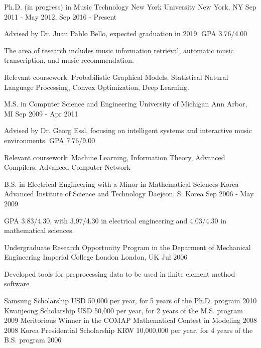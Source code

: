 \documentclass[12pt, a4paper]{awesome-cv}
\begin{document}
	
	\begin{cventries}
		\cventry
		{Ph.D. (in progress) in Music Technology}
		{New York University}
		{New York, NY}
		{Sep 2011 - May 2012, Sep 2016 - Present}
		{
			\begin{cvitemscondensed}
				\item Advised by Dr. Juan Pablo Bello, expected graduation in 2019. GPA 3.76/4.00
				\item The area of research includes music information retrieval, automatic music transcription, and music recommendation.
				\item Relevant coursework: Probabilistic Graphical Models, Statistical Natural Language Processing, Convex Optimization, Deep Learning.
			\end{cvitemscondensed}
		}
		\cventry
		{M.S. in Computer Science and Engineering}
		{University of Michigan}
		{Ann Arbor, MI}
		{Sep 2009 - Apr 2011}
		{
			\begin{cvitemscondensed}
				\item Advised by Dr. Georg Essl, focusing on intelligent systems and interactive music environments. GPA 7.76/9.00
				\item Relevant coursework: Machine Learning, Information Theory, Advanced Compilers, Advanced Computer Network
			\end{cvitemscondensed}
		}
		\cventry
		{B.S. in Electrical Engineering with a Minor in Mathematical Sciences}
		{Korea Advanced Institute of Science and Technology}
		{Daejeon, S. Korea}
		{Sep 2006 - May 2009}
		{
			\begin{cvitemscondensed}
				\item {GPA 3.83/4.30, with 3.97/4.30 in electrical engineering and 4.03/4.30 in mathematical sciences.}
			\end{cvitemscondensed}
		}
		\cventry
		{Undergraduate Research Opportunity Program in the Deparment of Mechanical Engineering}
		{Imperial College London}
		{London, UK}
		{Jul 2006}
		{
			\begin{cvitemscondensed}
				\item {Developed tools for preprocessing data to be used in finite element method software}
			\end{cvitemscondensed}
		}
	\end{cventries}

	\begin{cvhonors}
		\cvhonor
		{Samsung Scholarship}
		{USD 50,000 per year, for 5 years of the Ph.D. program}
		{}{2010}
		\cvhonor
		{Kwanjeong Scholarship}
		{USD 50,000 per year, for 2 years of the M.S. program}
		{}{2009}
		\cvhonor
		{Meritorious Winner}
		{in the COMAP Mathematical Contest in Modeling 2008}
		{}{2008}
		\cvhonor
		{Korea Presidential Scholarship}
		{KRW 10,000,000 per year, for 4 years of the B.S. program}
		{}{2006}
	\end{cvhonors}
\end{document}
